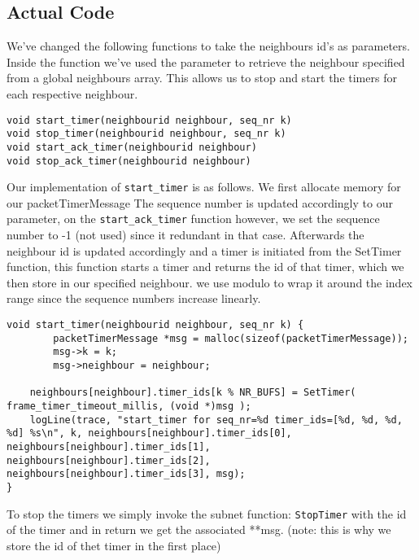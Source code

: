 \hfill \break
\subsection{Actual Code}




We've changed the following functions to take the neighbours id's as parameters.
Inside the function we've used the parameter to retrieve the neighbour specified from a global neighbours array.
This allows us to stop and start the timers for each respective neighbour.

\begin{lstlisting}
void start_timer(neighbourid neighbour, seq_nr k)
void stop_timer(neighbourid neighbour, seq_nr k)
void start_ack_timer(neighbourid neighbour)
void stop_ack_timer(neighbourid neighbour)
\end{lstlisting}


Our implementation of \texttt{start\_timer} is as follows. We first allocate memory for our {packetTimerMessage}
The sequence number is updated accordingly to our parameter, on the \linebreak\texttt{start\_ack\_timer} function however, we set the sequence number to -1 (not used) since it redundant in that case.
Afterwards the neighbour id is updated accordingly and a timer is initiated from the SetTimer function, this function starts a timer and returns the id of that timer,
which we then store in our specified neighbour.
we use modulo to wrap it around the index range since the sequence numbers increase linearly.
\begin{lstlisting}
void start_timer(neighbourid neighbour, seq_nr k) {
        packetTimerMessage *msg = malloc(sizeof(packetTimerMessage));
        msg->k = k;
        msg->neighbour = neighbour;

	neighbours[neighbour].timer_ids[k % NR_BUFS] = SetTimer( frame_timer_timeout_millis, (void *)msg );
	logLine(trace, "start_timer for seq_nr=%d timer_ids=[%d, %d, %d, %d] %s\n", k, neighbours[neighbour].timer_ids[0], neighbours[neighbour].timer_ids[1], neighbours[neighbour].timer_ids[2], neighbours[neighbour].timer_ids[3], msg);
}
\end{lstlisting}


To stop the timers we simply invoke the subnet function: \texttt{StopTimer} with the id of the timer
and in return we get the associated **msg. (note: this is why we store the id of thet timer in the first place)


